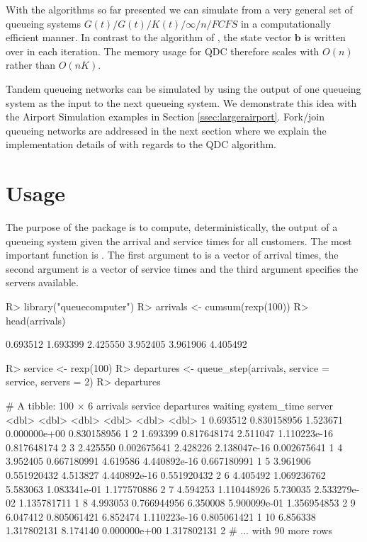 \documentclass[article]{jss}
\begin{document}
With the algorithms so far presented we can simulate from a very general set of queueing systems $G(t)/G(t)/K(t)/\infty/n/FCFS$ in a computationally efficient manner. In contrast to the algorithm of \cite{kin_generalized_2010}, the state vector $\mathbf{b}$ is written over in each iteration. The memory usage for QDC therefore scales with $O(n)$ rather than $O(nK)$. 

Tandem queueing networks can be simulated by using the output of one queueing system as the input to the next queueing system. We demonstrate this idea with the Airport Simulation examples in Section \ref{ssec:largerairport}. Fork/join queueing networks are addressed in the next section where we explain the implementation details of  with regards to the QDC algorithm.  

\section{Usage} \label{sec:usage}

The purpose of the package  is to compute, deterministically, the output of a queueing system given the arrival and service times for all customers. The most important function is . The first argument to   is a vector of arrival times, the second argument is a vector of service times and the third argument specifies the servers available. 

\begin{CodeChunk}
\begin{CodeInput}
R> library("queuecomputer")
R> arrivals <- cumsum(rexp(100))
R> head(arrivals)
\end{CodeInput}
\begin{CodeOutput}
[1] 0.693512 1.693399 2.425550 3.952405 3.961906 4.405492
\end{CodeOutput}
\begin{CodeInput}
R> service <- rexp(100)
R> departures <- queue_step(arrivals, service = service, servers = 2)
R> departures
\end{CodeInput}
\begin{CodeOutput}
# A tibble: 100 × 6
   arrivals     service departures      waiting system_time server
      <dbl>       <dbl>      <dbl>        <dbl>       <dbl>  <dbl>
1  0.693512 0.830158956   1.523671 0.000000e+00 0.830158956      1
2  1.693399 0.817648174   2.511047 1.110223e-16 0.817648174      2
3  2.425550 0.002675641   2.428226 2.138047e-16 0.002675641      1
4  3.952405 0.667180991   4.619586 4.440892e-16 0.667180991      1
5  3.961906 0.551920432   4.513827 4.440892e-16 0.551920432      2
6  4.405492 1.069236762   5.583063 1.083341e-01 1.177570886      2
7  4.594253 1.110448926   5.730035 2.533279e-02 1.135781711      1
8  4.993053 0.766944956   6.350008 5.900099e-01 1.356954853      2
9  6.047412 0.805061421   6.852474 1.110223e-16 0.805061421      1
10 6.856338 1.317802131   8.174140 0.000000e+00 1.317802131      2
# ... with 90 more rows
\end{CodeOutput}
\end{CodeChunk}
\end{document}

